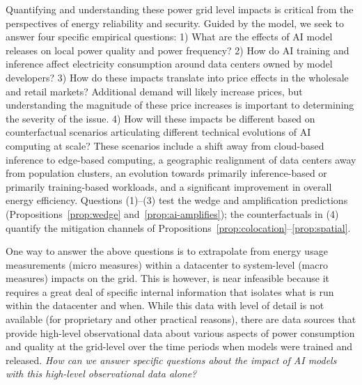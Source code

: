 \documentclass[a4paper,fleqn,longmktitle]{cas-sc}
\newcommand{\nb}[1]{\textcolor{blue}{NB[#1]}}
\theoremstyle{plain}
\theoremstyle{definition}
\begin{document}
Quantifying and understanding these power grid level impacts is critical from the perspectives of energy reliability and security. Guided by the model, we seek to answer four specific empirical questions: 1) What are the effects of AI model releases on local power quality and power frequency? 2) How do AI training and inference affect electricity consumption around data centers owned by model developers? 3) How do these impacts translate into price effects in the wholesale and retail markets? Additional demand will likely increase prices, but understanding the magnitude of these price increases is important to determining the severity of the issue. 4) How will these impacts be different based on counterfactual scenarios articulating different technical evolutions of AI computing at scale? These scenarios include a shift away from cloud-based inference to edge-based computing, a geographic realignment of data centers away from population clusters, an evolution towards primarily inference-based or primarily training-based workloads, and a significant improvement in overall energy efficiency. Questions (1)--(3) test the wedge and amplification predictions (Propositions~\ref{prop:wedge} and~\ref{prop:ai-amplifies}); the counterfactuals in (4) quantify the mitigation channels of Propositions~\ref{prop:colocation}--\ref{prop:spatial}.

One way to answer the above questions is to extrapolate from energy usage measurements (micro measures) within a datacenter to system-level (macro measures) impacts on the grid. This is however, is near infeasible because it requires a great deal of specific internal information that isolates what is run within the datacenter and when. While this data with level of detail is not available (for proprietary and other practical reasons), there are data sources that provide high-level observational data about various aspects of power consumption and quality at the grid-level over the time periods when models were trained and released. \emph{How can we answer specific questions about the impact of AI models with this high-level observational data alone?}
\end{document}

